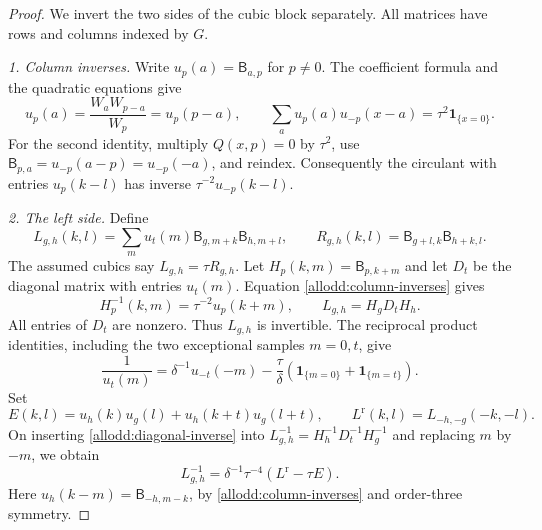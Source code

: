 \documentclass[11pt]{article}
\numberwithin{equation}{section}
\theoremstyle{definition}
\theoremstyle{remark}
\newcommand{\ind}[1]{\mathbf1_{\{#1\}}}
\begin{document}
\begin{proof}
We invert the two sides of the cubic block separately. All matrices
have rows and columns indexed by $G$.

\emph{1. Column inverses.} Write $u_p(a)=\mathsf B_{a,p}$ for
$p\ne0$.  The coefficient formula and the quadratic equations give
\begin{equation}\label{allodd:column-inverses}
 u_p(a)=\frac{W_aW_{p-a}}{W_p}=u_p(p-a),\qquad
 \sum_a u_p(a)u_{-p}(x-a)=\tau^2\ind{x=0}.
\end{equation}
For the second identity, multiply $Q(x,p)=0$ by $\tau^2$,
use $\mathsf B_{p,a}=u_{-p}(a-p)=u_{-p}(-a)$, and reindex.
Consequently the circulant with entries $u_p(k-l)$ has inverse
$\tau^{-2}u_{-p}(k-l)$.

\emph{2. The left side.} Define
\[
 L_{g,h}(k,l)=\sum_m u_t(m)\mathsf B_{g,m+k}
                                      \mathsf B_{h,m+l},
 \qquad
 R_{g,h}(k,l)=\mathsf B_{g+l,k}\mathsf B_{h+k,l}.
\]
The assumed cubics say $L_{g,h}=\tau R_{g,h}$.
Let $H_p(k,m)=\mathsf B_{p,k+m}$ and let $D_t$ be the
diagonal matrix with entries $u_t(m)$.  Equation
\eqref{allodd:column-inverses} gives
\[
 H_p^{-1}(k,m)=\tau^{-2}u_p(k+m),\qquad
 L_{g,h}=H_gD_tH_h.
\]
All entries of $D_t$ are nonzero.  Thus $L_{g,h}$ is invertible.
The reciprocal product identities, including the two exceptional samples $m=0,t$,
give
\begin{equation}\label{allodd:diagonal-inverse}
 \frac1{u_t(m)}=\delta^{-1}u_{-t}(-m)
       -\frac{\tau}{\delta}
                    (\ind{m=0}+\ind{m=t}).
\end{equation}
Set
\[
 E(k,l)=u_h(k)u_g(l)+u_h(k+t)u_g(l+t),
 \qquad
 L^{\mathrm r}(k,l)=L_{-h,-g}(-k,-l).
\]
On inserting \eqref{allodd:diagonal-inverse} into
$L_{g,h}^{-1}=H_h^{-1}D_t^{-1}H_g^{-1}$ and replacing
$m$ by $-m$, we obtain
\begin{equation}\label{allodd:left-inverse}
 L_{g,h}^{-1}=\delta^{-1}\tau^{-4}
                         (L^{\mathrm r}-\tau E).
\end{equation}
Here $u_h(k-m)=\mathsf B_{-h,m-k}$, by
\eqref{allodd:column-inverses} and order-three symmetry.


\end{proof}
\end{document}
